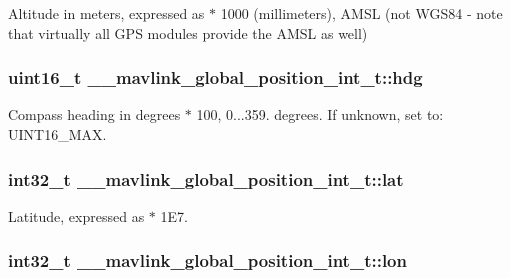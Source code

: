 Altitude in meters, expressed as $\ast$ 1000 (millimeters), A\+M\+S\+L (not W\+G\+S84 -\/ note that virtually all G\+P\+S modules provide the A\+M\+S\+L as well) 

\hypertarget{struct____mavlink__global__position__int__t_a60f7c02018c444cdffb6121dee854e19}{
\subsubsection[{hdg}]{\setlength{\rightskip}{0pt plus 5cm}uint16\+\_\+t \+\_\+\+\_\+mavlink\+\_\+global\+\_\+position\+\_\+int\+\_\+t\+::hdg}}\label{struct____mavlink__global__position__int__t_a60f7c02018c444cdffb6121dee854e19}


Compass heading in degrees $\ast$ 100, 0...359. degrees. If unknown, set to\+: U\+I\+N\+T16\+\_\+\+M\+A\+X. 

\hypertarget{struct____mavlink__global__position__int__t_a949653d08153161bb49b94794169a70f}{
\subsubsection[{lat}]{\setlength{\rightskip}{0pt plus 5cm}int32\+\_\+t \+\_\+\+\_\+mavlink\+\_\+global\+\_\+position\+\_\+int\+\_\+t\+::lat}}\label{struct____mavlink__global__position__int__t_a949653d08153161bb49b94794169a70f}


Latitude, expressed as $\ast$ 1\+E7. 

\hypertarget{struct____mavlink__global__position__int__t_a2350bdf8af429bc2ed49b7cfac61cee7}{
\subsubsection[{lon}]{\setlength{\rightskip}{0pt plus 5cm}int32\+\_\+t \+\_\+\+\_\+mavlink\+\_\+global\+\_\+position\+\_\+int\+\_\+t\+::lon}}\label{struct____mavlink__global__position__int__t_a2350bdf8af429bc2ed49b7cfac61cee7}


